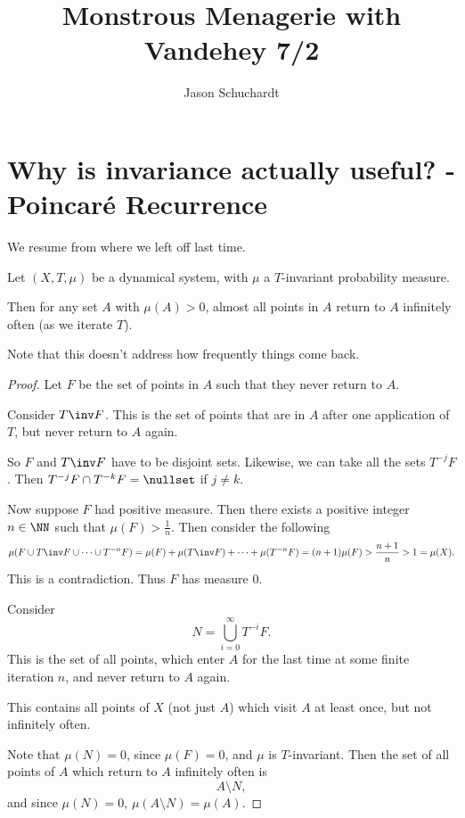 \documentclass{article}
\title{Monstrous Menagerie with Vandehey 7/2}
\author{Jason Schuchardt}
\theoremstyle{remark}
\begin{document}
\maketitle

\section{Why is invariance actually useful? - Poincar\'e Recurrence}

We resume from where we left off last time.

\begin{theorem}
    Let $(X,T,\mu)$ be a dynamical system, with $\mu$ a 
    $T$-invariant probability measure.

    Then for any set $A$ with $\mu(A) > 0$, almost all 
    points in $A$ return to $A$ infinitely often (as we 
    iterate $T$).
\end{theorem}

Note that this doesn't address how frequently things come back.

\begin{proof}
    Let $F$ be the set of points in $A$ such that 
    they never return to $A$.

    Consider $T\inv F$. This is the set of points
    that are in $A$ after one application of $T$, but
    never return to $A$ again.

    So $F$ and $T\inv F$ have to be disjoint sets.
    Likewise, we can take all the sets $T^{-j}F$.
    Then $T^{-j}F\cap T^{-k}F = \nullset$ if $j\ne k$.

    Now suppose $F$ had positive measure. Then there 
    exists a positive integer $n\in\NN$ such that
    $\mu(F) > \frac{1}{n}$. Then consider the
    following 
    \[ \mu(F\cup T\inv F\cup\cdots \cup T^{-n}F)
    = \mu(F)+\mu(T\inv F) +\cdots + \mu(T^{-n}F)
    = (n+1)\mu(F)
    > \frac{n+1}{n}
    > 1 = \mu(X).
    \]
    This is a contradiction. Thus $F$ has measure $0$.

    Consider 
    \[ N=\bigcup_{i=0}^\infty T^{-i} F. \]
    This is the set of all points, which enter $A$
    for the last time at some finite iteration $n$,
    and never return to $A$ again.

    This contains all points of $X$ (not just $A$)
    which visit $A$ at least once, but not infinitely
    often. 

    Note that $\mu(N)=0$, since $\mu(F)=0$, and
    $\mu$ is $T$-invariant.
    Then the set of all points of $A$
    which return to $A$ infinitely often is 
    \[ A\setminus N, \]
    and since $\mu(N)=0$,
    $\mu(A\setminus N) = \mu(A)$.
\end{proof}
\end{document}
